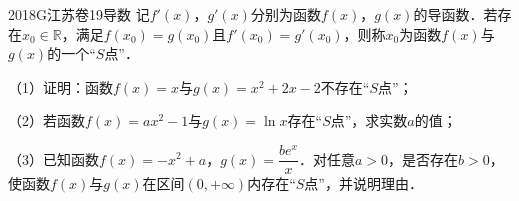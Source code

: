 
\begin{problem}{2018}{G}{江苏卷}{19}{导数}
记$f'(x)$，$g'(x)$分别为函数$f(x)$，$g(x)$的导函数．若存在$x_0\in\mathbb{R}$，满足$f(x_0)=g(x_0)$且$f'(x_0)=g'(x_0)$，则称$x_0$为函数$f(x)$与$g(x)$的一个“$S$点”．

（1）证明：函数$f(x)=x$与$g(x)=x^2+2x-2$不存在“$S$点”；

（2）若函数$f(x)=ax^2-1$与$g(x)=\ln x$存在“$S$点”，求实数$a$的值；

（3）已知函数$f(x)=-x^2+a$，$g(x)=\dfrac{be^x}{x}$．对任意$a>0$，是否存在$b>0$，使函数$f(x)$与$g(x)$在区间$(0,+\infty)$内存在“$S$点”，并说明理由．
\end{problem}